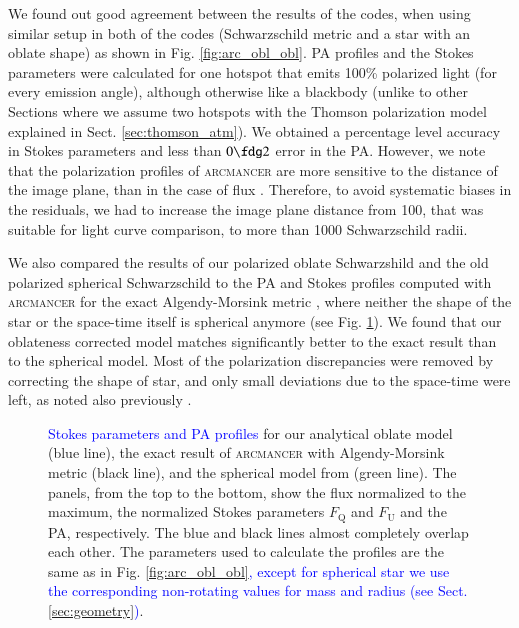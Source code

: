 \documentclass{aa}
\newcommand{\blue}[1]{\textcolor{blue}{#1}}
\begin{document}
We found out good agreement between the results of the codes, when using similar setup in both of the codes (Schwarzschild metric and a star with an oblate shape) as shown in Fig. \ref{fig:arc_obl_obl}.
PA profiles and the Stokes parameters were calculated for one hotspot that emits 100\% polarized light (for every emission angle), although otherwise like a blackbody
(unlike to other Sections where we assume two hotspots with the Thomson polarization model explained in Sect. \ref{sec:thomson_atm}).
We obtained a percentage level accuracy in Stokes parameters and less than $0\fdg2$ error in the PA.
However, we note that the polarization profiles of \textsc{arcmancer} are more sensitive to the distance of the image plane, than in the case of flux \citep[comparisons between fluxes were made in][]{NP18}.
Therefore, to avoid systematic biases in the residuals, we had to increase the image plane distance from 100, that was suitable for light curve comparison, to more than 1000 Schwarzschild radii. 

We also compared the results of our polarized oblate Schwarzshild and the old polarized spherical Schwarzschild to the PA and Stokes profiles computed with \textsc{arcmancer} for the exact Algendy-Morsink metric \citep{AGM14}, where neither the shape of the star or the space-time itself is spherical anymore (see Fig. \ref{fig:arc_agm_obl_sph}).
We found that our oblateness corrected model matches significantly better to the exact result than to the spherical model. 
Most of the polarization discrepancies were removed by correcting the shape of star, and only small deviations due to the space-time were left, as noted also previously \citep{PMN18}.


\begin{figure}
\vspace*{-0.4cm}
\caption{
\blue{Stokes parameters and PA profiles} for our analytical oblate model (blue line), the  exact result of \textsc{arcmancer} with Algendy-Morsink metric (black line), and the spherical model from \citet{VP04} (green line). 
The panels, from the top to the bottom, show the flux normalized to the maximum, the normalized Stokes parameters $F_{\mathrm{Q}}$ and $F_{\mathrm{U}}$ and the PA, respectively. 
The blue and black lines almost completely overlap each other.
The parameters used to calculate the profiles are the same as in Fig. \ref{fig:arc_obl_obl}\blue{, except for spherical star we use the corresponding non-rotating values for mass and radius (see Sect. \ref{sec:geometry})}.
}
\label{fig:arc_agm_obl_sph}
\end{figure}
\end{document}
